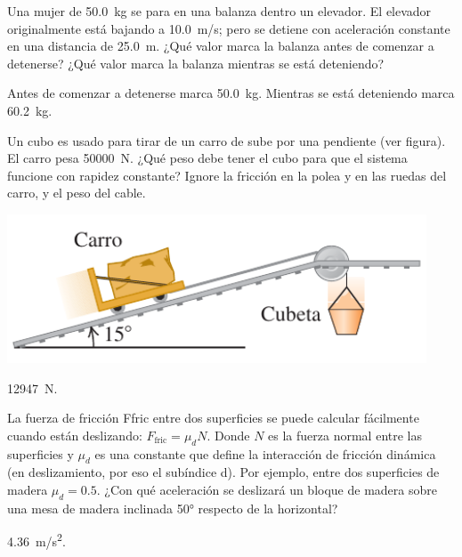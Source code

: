 \documentclass[11pt]{article}
\begin{document}
\begin{multicols}{2}
\begin{exercise}
    Una mujer de \qty{50.0}{kg} se para en una balanza dentro un elevador. El elevador originalmente está bajando a \qty{10.0}{m/s}; pero se detiene con aceleración constante en una distancia de \qty{25.0}{m}. ¿Qué valor marca la balanza antes de comenzar a detenerse? ¿Qué valor marca la balanza mientras se está deteniendo?
\end{exercise}
\begin{solution}
    Antes de comenzar a detenerse marca \qty{50.0}{kg}. Mientras se está deteniendo marca \qty{60.2}{kg}.
\end{solution}
\end{multicols}

\begin{multicols}{2}
\begin{exercise}
    Un cubo es usado para tirar de un carro de sube por una pendiente (ver figura). El carro pesa \qty{50000}{N}. ¿Qué peso debe tener el cubo para que el sistema funcione con rapidez constante? Ignore la fricción en la polea y en las ruedas del carro, y el peso del cable.
\begin{center}
    \includegraphics[scale=0.5]{figs/prob-07.png}
\end{center}
\end{exercise}
\begin{solution}
    \qty{12947}{N}. 
\end{solution}
\end{multicols}

\begin{multicols}{2}
\begin{exercise}
La fuerza de fricción Ffric entre dos superficies se puede calcular fácilmente cuando están deslizando: $F_{\text{fric}} = \mu_d N$. Donde $N$ es la fuerza normal entre las superficies y $\mu_d$ es una constante que define la interacción de fricción dinámica (en deslizamiento, por eso el subíndice d). Por ejemplo, entre dos superficies de madera $\mu_d = 0.5$. ¿Con qué aceleración se deslizará un bloque de madera sobre una mesa de madera inclinada \ang{50} respecto de la horizontal?
\end{exercise}
\begin{solution}
    \qty{4.36}{m/s^2}.
\end{solution}
\end{multicols}
\end{document}
